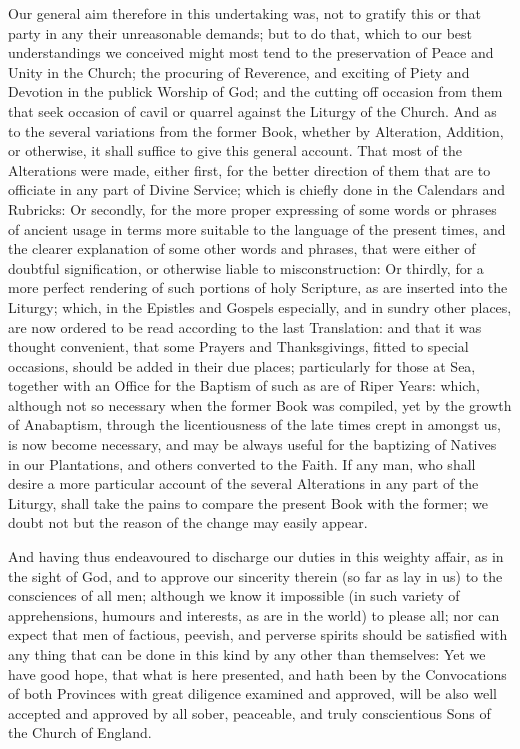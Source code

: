 \newpage

Our general aim therefore in this undertaking was, not to gratify this or that party in any their unreasonable demands; but to do that, which to our best understandings we conceived might most tend to the preservation of Peace and Unity in the Church; the procuring of Reverence, and exciting of Piety and Devotion in the publick Worship of God; and the cutting off occasion from them that seek occasion of cavil or quarrel against the Liturgy of the Church. And as to the several variations from the former Book, whether by Alteration, Addition, or otherwise, it shall suffice to give this general account. That most of the Alterations were made, either first, for the better direction of them that are to officiate in any part of Divine Service; which is chiefly done in the Calendars and Rubricks: Or secondly, for the more proper expressing of some words or phrases of ancient usage in terms more suitable to the language of the present times, and the clearer explanation of some other words and phrases, that were either of doubtful signification, or otherwise liable to misconstruction: Or thirdly, for a more perfect rendering of such portions of holy Scripture, as are inserted into the Liturgy; which, in the Epistles and Gospels especially, and in sundry other places, are now ordered to be read according to the last Translation: and that it was thought convenient, that some Prayers and Thanksgivings, fitted to special occasions, should be added in their due places; particularly for those at Sea, together with an Office for the Baptism of such as are of Riper Years: which, although not so necessary when the former Book was compiled, yet by the growth of Anabaptism, through the licentiousness of the late times crept in amongst us, is now become necessary, and may be always useful for the baptizing of Natives in our Plantations, and others converted to the Faith. If any man, who shall desire a more particular account of the several Alterations in any part of the Liturgy, shall take the pains to compare the present Book with the former; we doubt not but the reason of the change may easily appear.

And having thus endeavoured to discharge our duties in this weighty affair, as in the sight of God, and to approve our sincerity therein (so far as lay in us) to the consciences of all men; although we know it impossible (in such variety of apprehensions, humours and interests, as are in the world) to please all; nor can expect that men of factious, peevish, and perverse spirits should be satisfied with any thing that can be done in this kind by any other than themselves: Yet we have good hope, that what is here presented, and hath been by the Convocations of both Provinces with great diligence examined and approved, will be also well accepted and approved by all sober, peaceable, and truly conscientious Sons of the Church of England.

\clearpage
